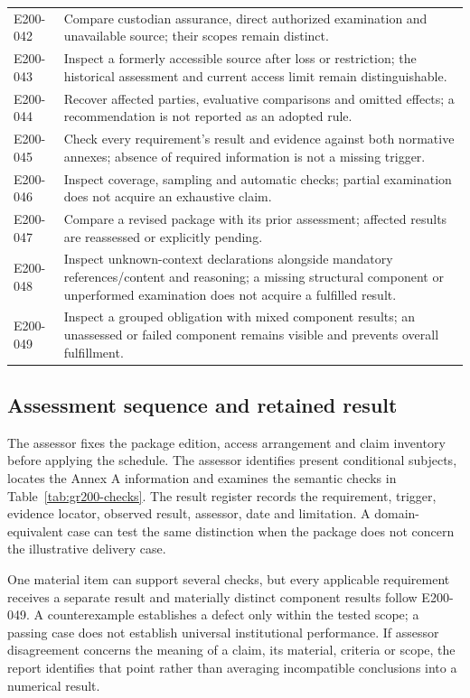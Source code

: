 \documentclass[11pt,a4paper]{article}
\begin{document}
\begin{longtable}{@{}L{0.16\textwidth}L{0.74\textwidth}@{}}
E200-042 & Compare custodian assurance, direct authorized examination and unavailable source; their scopes remain distinct. \\
E200-043 & Inspect a formerly accessible source after loss or restriction; the historical assessment and current access limit remain distinguishable. \\
E200-044 & Recover affected parties, evaluative comparisons and omitted effects; a recommendation is not reported as an adopted rule. \\
E200-045 & Check every requirement's result and evidence against both normative annexes; absence of required information is not a missing trigger. \\
E200-046 & Inspect coverage, sampling and automatic checks; partial examination does not acquire an exhaustive claim. \\
E200-047 & Compare a revised package with its prior assessment; affected results are reassessed or explicitly pending. \\
E200-048 & Inspect unknown-context declarations alongside mandatory references/content and reasoning; a missing structural component or unperformed examination does not acquire a fulfilled result. \\
E200-049 & Inspect a grouped obligation with mixed component results; an unassessed or failed component remains visible and prevents overall fulfillment. \\
\bottomrule
\end{longtable}

\subsection{Assessment sequence and retained result}
The assessor fixes the package edition, access arrangement and claim inventory before applying the schedule. The assessor identifies present conditional subjects, locates the Annex A information and examines the semantic checks in Table~\ref{tab:gr200-checks}. The result register records the requirement, trigger, evidence locator, observed result, assessor, date and limitation. A domain-equivalent case can test the same distinction when the package does not concern the illustrative delivery case.

One material item can support several checks, but every applicable requirement receives a separate result and materially distinct component results follow E200-049. A counterexample establishes a defect only within the tested scope; a passing case does not establish universal institutional performance. If assessor disagreement concerns the meaning of a claim, its material, criteria or scope, the report identifies that point rather than averaging incompatible conclusions into a numerical result.
\end{document}
